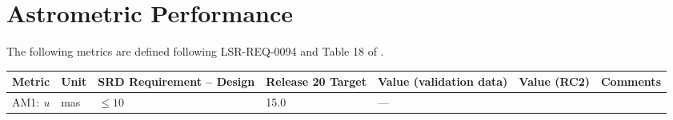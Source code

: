 \documentclass[DM,lsstdraft,toc]{lsstdoc}
\begin{document}
\section{Astrometric Performance}\label{astrometric-performance}

The following metrics are defined following LSR-REQ-0094
 and Table 18 of .

\begin{longtable}[]{@{}lllllll@{}}
\toprule
\begin{minipage}[b]{0.12\columnwidth}\raggedright\strut
Metric\strut
\end{minipage} & \begin{minipage}[b]{0.06\columnwidth}\raggedright\strut
Unit\strut
\end{minipage} & \begin{minipage}[b]{0.14\columnwidth}\raggedright\strut
SRD Requirement -- Design\strut
\end{minipage} & \begin{minipage}[b]{0.14\columnwidth}\raggedright\strut
Release 20 Target\strut
\end{minipage} & \begin{minipage}[b]{0.12\columnwidth}\raggedright\strut
Value (validation data)\strut
\end{minipage} & \begin{minipage}[b]{0.12\columnwidth}\raggedright\strut
Value (RC2) \strut
\end{minipage} & \begin{minipage}[b]{0.17\columnwidth}\raggedright\strut
Comments\strut
\end{minipage}\tabularnewline
\midrule
\endhead
\begin{minipage}[t]{0.12\columnwidth}\raggedright\strut
AM1: \emph{u}\strut
\end{minipage} & \begin{minipage}[t]{0.06\columnwidth}\raggedright\strut
mas\strut
\end{minipage} & \begin{minipage}[t]{0.14\columnwidth}\raggedright\strut
\(\leq 10\)\strut
\end{minipage} & \begin{minipage}[t]{0.14\columnwidth}\raggedright\strut
15.0\strut
\end{minipage} & \begin{minipage}[t]{0.12\columnwidth}\raggedright\strut
---\strut
\end{minipage} & \begin{minipage}[t]{0.12\columnwidth}\raggedright\strut

\end{minipage}
\end{longtable}
\end{document}
